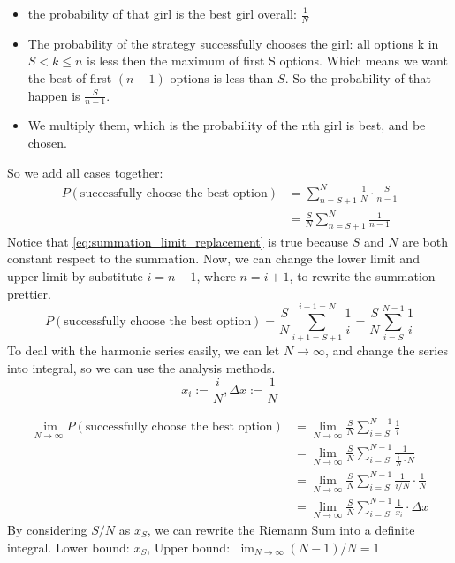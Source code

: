\documentclass{article}
\begin{document}
\begin{itemize}[itemsep=4pt, topsep=4pt]
    \item the probability of that girl is the best girl overall: $\frac{1}{N}$
    \item The probability of the strategy successfully chooses the girl: all options k in $S<k\leq n$ is less then the maximum of first S options. Which means we want the best of first $(n-1)$ options is less than $S$. So the probability of that happen is $\frac{S}{n-1}$.
    \item We multiply them, which is the probability of the nth girl is best, and be chosen. 
\end{itemize}
So we add all cases together: 
\begin{align}
    P(\text{successfully choose the best option}) &=\sum_{n=S+1}^{N} \frac{1}{N}\cdot \frac{S}{n-1}\\ 
    &=\frac{S}{N}\sum_{n=S+1}^{N}\frac{1}{n-1} \label{eq:summation_limit_replacement}
\end{align}
Notice that \eqref{eq:summation_limit_replacement} is true because $S$ and $N$ are both constant respect to the summation.
Now, we can change the lower limit and upper limit by substitute $i = n-1$, where $n= i+1$, to rewrite the summation prettier. 
\begin{equation}
    P(\text{successfully choose the best option}) =\frac{S}{N}\sum_{i+1=S+1}^{i+1=N}\frac{1}{i} = \frac{S}{N}\sum_{i=S}^{N-1}\frac{1}{i}
\end{equation}
To deal with the harmonic series easily, we can let $N\to \infty$, and change the series into integral, so we can use the analysis methods. 
\begin{equation}
x_i := \frac{i}{N}, \Delta x := \frac{1}{N} \nonumber
\end{equation}

\begin{align}
    \lim_{N \to \infty} P(\text{successfully choose the best option}) &=\lim_{N \to \infty} \frac{S}{N}\sum_{i=S}^{N-1}\frac{1}{i}\nonumber\\
    &= \lim_{N \to \infty} \frac{S}{N}\sum_{i=S}^{N-1}\frac{1}{\frac{i}{N}\cdot N}\nonumber\\
    &= \lim_{N \to \infty} \frac{S}{N}\sum_{i=S}^{N-1}\frac{1}{i/N}\cdot \frac{1}{N}\nonumber\\
    &= \lim_{N \to \infty} \frac{S}{N}\sum_{i=S}^{N-1}\frac{1}{x_i}\cdot \Delta x \label{eq:riemann_sum}
\end{align}
By considering $S/N$ as $x_S$, we can rewrite the Riemann Sum into a definite integral. Lower bound: $x_S$, Upper bound: $\lim_{N \to \infty} (N-1)/N = 1$
    
\end{document}
